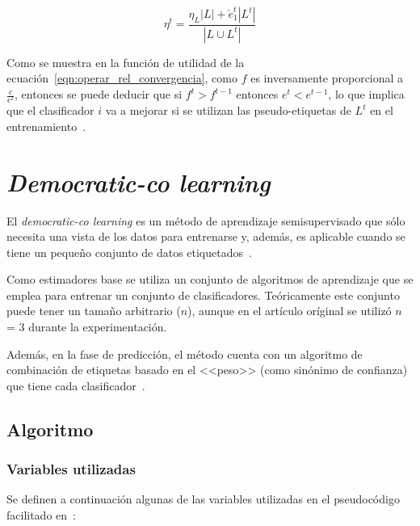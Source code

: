 \begin{equation}\label{eqn:ruido_it_tritraining} \eta^{t} = \frac{\eta_{L}|L| + \check{e}_{1}^{t}|L^{t}|}{|L \cup L^{t}|} \end{equation} 

Como se muestra en la función de utilidad de la ecuación~\ref{eqn:operar_rel_convergencia}, como $f$ es inversamente proporcional a  $\frac{c}{\epsilon^{2}}$, entonces se puede deducir que si $f^t > f^{t-1}$ entonces $e^t < e^{t-1}$, lo que implica que el clasificador $i$ va a mejorar si se utilizan las pseudo-etiquetas de $L^t$ en el entrenamiento~\cite{tritraining2005@original}.

\section{\textit{Democratic-co learning}}
\label{democraticco-teoria}

El \textit{democratic-co learning} es un método de aprendizaje semisupervisado que sólo necesita una vista de los datos para entrenarse y, además, es aplicable cuando se tiene un pequeño conjunto de datos etiquetados~\cite{democraticCoLearning2004original}.

Como estimadores base se utiliza un conjunto de algoritmos de aprendizaje que se emplea para entrenar un conjunto de clasificadores. Teóricamente este conjunto puede tener un tamaño arbitrario ($n$), aunque en el artículo oríginal se utilizó $n$ = 3 durante la experimentación.

Además, en la fase de predicción, el método cuenta con un algoritmo de combinación de etiquetas basado en el <<peso>> (como sinónimo de confianza) que tiene cada clasificador~\cite{democraticCoLearning2004original}.

\subsection{Algoritmo}

\subsubsection{Variables utilizadas}

Se definen a continuación algunas de las variables utilizadas en el pseudocódigo facilitado en~\cite{democraticCoLearning2004original}:

